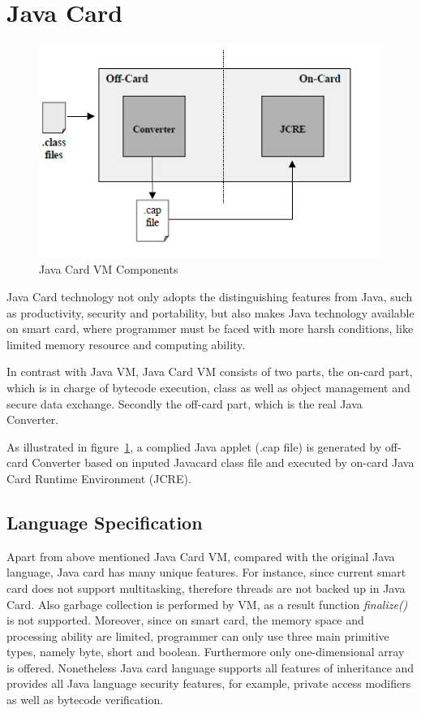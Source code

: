 \section{Java Card}
 \begin{figure}[!htb]
	\centering
	\includegraphics[width=1\textwidth]{jcvm.jpg}
		\caption{Java Card VM Components\cite{jcadg}}
	\label{fig:jcvm}
\end{figure}
Java Card technology not only adopts the distinguishing features from Java, such as productivity, security and portability\cite{jcadg}, but also makes Java technology available on smart card, where programmer must be faced with more harsh conditions, like limited memory resource and computing ability.

In contrast with Java VM, Java Card VM consists of two parts, the on-card part, which is in charge of bytecode execution, class as well as object management and secure data exchange. Secondly the off-card part, which is the real Java Converter.

As illustrated in figure~\ref{fig:jcvm}, a complied Java applet (.cap file) is generated by off-card Converter based on inputed Javacard class file and executed by on-card Java Card Runtime Environment (JCRE). 

\subsection{Language Specification}
Apart from above mentioned Java Card VM, compared with the original Java language, Java card has many unique features. For instance,
since current smart card does not support multitasking, therefore threads are not backed up in Java Card. Also garbage collection  is performed by VM, as a result function \emph{finalize()} is not supported. Moreover, since on smart card, the memory space and processing ability are limited, programmer can only use three main primitive types, namely byte, short and boolean. Furthermore only one-dimensional array is offered. Nonetheless Java card language supports all features of inheritance and provides all Java language security features, for example, private access modifiers as well as bytecode verification\cite{jcadg}.

